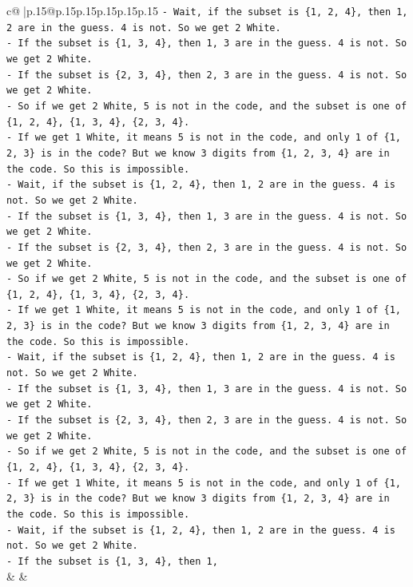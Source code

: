 \documentclass{article}
\begin{document}
{\begin{supertabular}{c@{$\;$}|p{.15\linewidth}@{}p{.15\linewidth}p{.15\linewidth}p{.15\linewidth}p{.15\linewidth}p{.15\linewidth}}
{{{\texttt{{-} Wait, if the subset is \{1, 2, 4\}, then 1, 2 are in the guess. 4 is not. So we get 2 White.} \\
\texttt{{-} If the subset is \{1, 3, 4\}, then 1, 3 are in the guess. 4 is not. So we get 2 White.} \\
\texttt{{-} If the subset is \{2, 3, 4\}, then 2, 3 are in the guess. 4 is not. So we get 2 White.} \\
\texttt{{-} So if we get 2 White, 5 is not in the code, and the subset is one of \{1, 2, 4\}, \{1, 3, 4\}, \{2, 3, 4\}.} \\
\texttt{{-} If we get 1 White, it means 5 is not in the code, and only 1 of \{1, 2, 3\} is in the code? But we know 3 digits from \{1, 2, 3, 4\} are in the code. So this is impossible.} \\
\texttt{{-} Wait, if the subset is \{1, 2, 4\}, then 1, 2 are in the guess. 4 is not. So we get 2 White.} \\
\texttt{{-} If the subset is \{1, 3, 4\}, then 1, 3 are in the guess. 4 is not. So we get 2 White.} \\
\texttt{{-} If the subset is \{2, 3, 4\}, then 2, 3 are in the guess. 4 is not. So we get 2 White.} \\
\texttt{{-} So if we get 2 White, 5 is not in the code, and the subset is one of \{1, 2, 4\}, \{1, 3, 4\}, \{2, 3, 4\}.} \\
\texttt{{-} If we get 1 White, it means 5 is not in the code, and only 1 of \{1, 2, 3\} is in the code? But we know 3 digits from \{1, 2, 3, 4\} are in the code. So this is impossible.} \\
\texttt{{-} Wait, if the subset is \{1, 2, 4\}, then 1, 2 are in the guess. 4 is not. So we get 2 White.} \\
\texttt{{-} If the subset is \{1, 3, 4\}, then 1, 3 are in the guess. 4 is not. So we get 2 White.} \\
\texttt{{-} If the subset is \{2, 3, 4\}, then 2, 3 are in the guess. 4 is not. So we get 2 White.} \\
\texttt{{-} So if we get 2 White, 5 is not in the code, and the subset is one of \{1, 2, 4\}, \{1, 3, 4\}, \{2, 3, 4\}.} \\
\texttt{{-} If we get 1 White, it means 5 is not in the code, and only 1 of \{1, 2, 3\} is in the code? But we know 3 digits from \{1, 2, 3, 4\} are in the code. So this is impossible.} \\
\texttt{{-} Wait, if the subset is \{1, 2, 4\}, then 1, 2 are in the guess. 4 is not. So we get 2 White.} \\
\texttt{{-} If the subset is \{1, 3, 4\}, then 1,} \\
            }
        }
    }
    & & \\ \\


\end{supertabular}}
\end{document}

